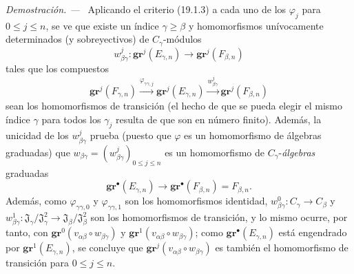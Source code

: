 \documentclass[10pt,oneside]{book}
\newenvironment{proof}{%
  \par\medskip\noindent\textit{Demostración. ---\ }}{\par}
\begin{document}
\begin{proof}
Aplicando el criterio (19.1.3) a cada uno de los $\varphi_j$ para $0\leq j\leq n$,
se ve que existe un índice $\gamma\geq\beta$ y homomorfismos
unívocamente determinados (y sobreyectivos) de $C_\gamma$-módulos
\[
  w_{\beta\gamma}^j:\mathbf{gr}^j(E_{\gamma,n})\longrightarrow
  \mathbf{gr}^j(F_{\beta,n})
\]
tales que los compuestos
\[
  \mathbf{gr}^j(F_{\gamma,n})
  \xrightarrow{\varphi_{\gamma\gamma,j}}\mathbf{gr}^j(E_{\gamma,n})
  \xrightarrow{w_{\beta\gamma}^j}\mathbf{gr}^j(F_{\beta,n})
\]
sean los homomorfismos de transición (el hecho de que se pueda elegir el mismo
índice $\gamma$ para todos los $\gamma_j$ resulta de que son en número
finito). Además, la unicidad de los $w_{\beta\gamma}^j$ prueba (puesto que $\varphi$ es
un homomorfismo de álgebras graduadas) que
$w_{\beta\gamma}=(w_{\beta\gamma}^j)_{0\leq j\leq n}$ es un homomorfismo de
$C_\gamma$-\emph{álgebras} graduadas
\[
  \mathbf{gr}^\bullet(E_{\gamma,n})\longrightarrow
  \mathbf{gr}^\bullet(F_{\beta,n})=F_{\beta,n}.
\]
Además, como $\varphi_{\gamma\gamma,0}$ y $\varphi_{\gamma\gamma,1}$ son
los homomorfismos identidad,
$w_{\beta\gamma}^0:C_\gamma\to C_\beta$ y
$w_{\beta\gamma}^1:\mathfrak J_\gamma/\mathfrak J_\gamma^2
\to\mathfrak J_\beta/\mathfrak J_\beta^2$ son los homomorfismos de
transición, y lo mismo ocurre, por tanto, con
$\mathbf{gr}^0(v_{\alpha\beta}\circ w_{\beta\gamma})$ y
$\mathbf{gr}^1(v_{\alpha\beta}\circ w_{\beta\gamma})$; como
$\mathbf{gr}^\bullet(E_{\gamma,n})$ está engendrado por $\mathbf{gr}^1(E_{\gamma,n})$, se concluye que
$\mathbf{gr}^j(v_{\alpha\beta}\circ w_{\beta\gamma})$ es también el homomorfismo de
transición para $0\leq j\leq n$.


\end{proof}
\end{document}
